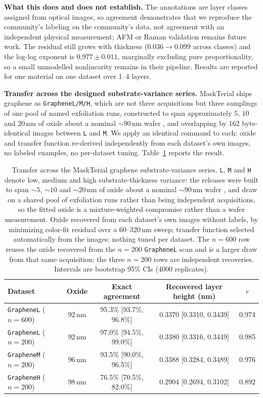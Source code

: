 \documentclass[10pt]{article}
\begin{document}
\textbf{What this does and does not establish.} The annotations are layer classes assigned from optical images, so agreement demonstrates that we reproduce the community's labeling on the community's data, not agreement with an independent physical measurement; AFM or Raman validation remains future work. The residual still grows with thickness ($0.036 \to 0.099$ across classes) and the log-log exponent is $0.977 \pm 0.011$, marginally excluding pure proportionality, so a small unmodelled nonlinearity remains in their pipeline. Results are reported for one material on one dataset over 1--4 layers.

\textbf{Transfer across the designed substrate-variance series.} MaskTerial ships graphene as \texttt{GrapheneL/M/H}, which are not three acquisitions but three samplings of one pool of named exfoliation runs, constructed to span approximately $5$, $10$ and $20$\,nm of oxide about a nominal ${\sim}90$\,nm wafer \cite{uslu2024maskterial}, and overlapping by 162 byte-identical images between \texttt{L} and \texttt{M}. We apply an identical command to each: oxide and transfer function re-derived independently from each dataset's own images, no labeled examples, no per-dataset tuning. Table~\ref{tab:cross} reports the result.

\begin{table}[h]
\centering
\caption{Transfer across the MaskTerial graphene substrate-variance series. \texttt{L}, \texttt{M} and \texttt{H} denote low, medium and high substrate-thickness variance: the releases were built to span ${\sim}5$, ${\sim}10$ and ${\sim}20$\,nm of oxide about a nominal ${\sim}90$\,nm wafer \cite{uslu2024maskterial}, and draw on a shared pool of exfoliation runs rather than being independent acquisitions, so the fitted oxide is a mixture-weighted compromise rather than a wafer measurement. Oxide recovered from each dataset's own images without labels, by minimizing color-fit residual over a 60--320\,nm sweep; transfer function selected automatically from the images; nothing tuned per dataset. The $n{=}600$ row reuses the oxide recovered from the $n{=}200$ \texttt{GrapheneL} scan and is a larger draw from that same acquisition; the three $n{=}200$ rows are independent recoveries. Intervals are bootstrap 95\% CIs (4000 replicates).}
\label{tab:cross}
\begin{tabular}{lcccc}
\toprule
Dataset & Oxide & Exact agreement & Recovered layer height (nm) & $r$ \\
\midrule
\texttt{GrapheneL} ($n{=}600$) & 92\,nm & 95.3\% [93.7\%, 96.8\%] & $0.3370$ [0.3310, 0.3439] & 0.974 \\
\texttt{GrapheneL} ($n{=}200$) & 92\,nm & 97.0\% [94.5\%, 99.0\%] & $0.3380$ [0.3316, 0.3449] & 0.985 \\
\texttt{GrapheneM} ($n{=}200$) & 96\,nm & 93.5\% [90.0\%, 96.5\%] & $0.3388$ [0.3284, 0.3489] & 0.976 \\
\texttt{GrapheneH} ($n{=}200$) & 98\,nm & 76.5\% [70.5\%, 82.0\%] & $0.2904$ [0.2694, 0.3102] & 0.892 \\
\bottomrule
\end{tabular}
\end{table}
\end{document}
